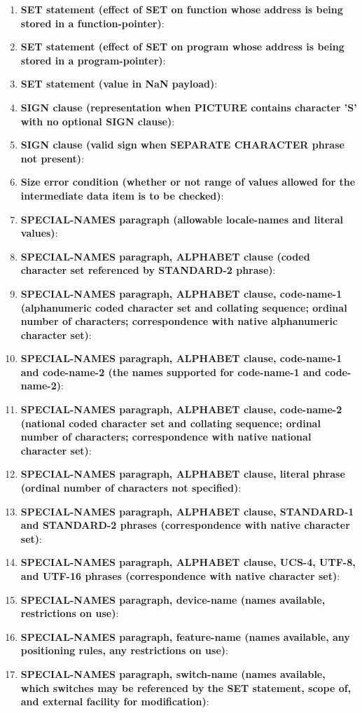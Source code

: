 \begin{enumerate}
\item \textbf{SET statement (effect of SET on function whose address is being stored in a function-pointer)}:
\item \textbf{SET statement (effect of SET on program whose address is being stored in a program-pointer)}:
\item \textbf{SET statement (value in NaN payload)}:
\item \textbf{SIGN clause (representation when PICTURE contains character 'S' with no optional SIGN clause)}:
\item \textbf{SIGN clause (valid sign when SEPARATE CHARACTER phrase not present)}:
\item \textbf{Size error condition (whether or not range of values allowed for the intermediate data item is to be checked)}:
\item \textbf{SPECIAL-NAMES paragraph (allowable locale-names and literal values)}:
\item \textbf{SPECIAL-NAMES paragraph, ALPHABET clause (coded character set referenced by STANDARD-2 phrase)}:
\item \textbf{SPECIAL-NAMES paragraph, ALPHABET clause, code-name-1 (alphanumeric coded character set and collating sequence; ordinal number of characters; correspondence with native alphanumeric character set)}:
\item \textbf{SPECIAL-NAMES paragraph, ALPHABET clause, code-name-1 and code-name-2 (the names supported for code-name-1 and code-name-2)}:
\item \textbf{SPECIAL-NAMES paragraph, ALPHABET clause, code-name-2 (national coded character set and collating sequence; ordinal number of characters; correspondence with native national character set)}:
\item \textbf{SPECIAL-NAMES paragraph, ALPHABET clause, literal phrase (ordinal number of characters not specified)}:
\item \textbf{SPECIAL-NAMES paragraph, ALPHABET clause, STANDARD-1 and STANDARD-2 phrases (correspondence with native character set)}:
\item \textbf{SPECIAL-NAMES paragraph, ALPHABET clause, UCS-4, UTF-8, and UTF-16 phrases (correspondence with native character set)}:
\item \textbf{SPECIAL-NAMES paragraph, device-name (names available, restrictions on use)}:
\item \textbf{SPECIAL-NAMES paragraph, feature-name (names available, any positioning rules, any restrictions on use)}:
\item \textbf{SPECIAL-NAMES paragraph, switch-name (names available, which switches may be referenced by the SET statement, scope of, and external facility for modification)}:

\end{enumerate}
